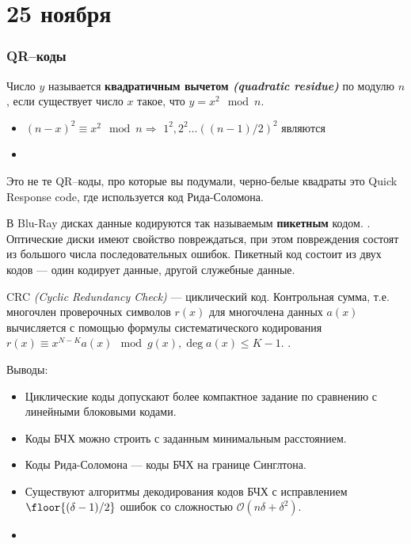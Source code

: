 \chapter{25 ноября}

\unfinished

\subsection{QR--коды}

\begin{definition}
    Число \(y\) называется \textbf{квадратичным вычетом
    \textit{(quadratic residue)}} по модулю \(n\), если существует число \(x\)
    такое, что \(y = x^2 \mod n\).
\end{definition}

\begin{prop}\itemfix
    \begin{itemize}
        \item \((n - x)^2 \equiv x^2 \mod n \Rightarrow\)
        \(1^2, 2^2 \dots ((n - 1) / 2)^2\) являются  \unfinished
        \item \unfinished
    \end{itemize}
\end{prop}

Это не те QR--коды, про которые вы подумали, черно-белые квадраты
это Quick Response code, где используется код Рида-Соломона.

В Blu-Ray дисках данные кодируются так называемым \textbf{пикетным}
кодом. \unfinished.
Оптические диски имеют свойство повреждаться, при этом повреждения
состоят из большого числа последовательных ошибок.
Пикетный код состоит из двух кодов --- один кодирует данные, другой
служебные данные. \unfinished

CRC \textit{(Cyclic Redundancy Check)} --- циклический код. 
Контрольная сумма, т.е. многочлен проверочных символов \(r(x)\)
для многочлена данных \(a(x)\) вычисляется с помощью формулы
систематического кодирования \(r(x) \equiv x^{N - K} a(x) \mod g(x),
\deg a(x) \leq K - 1\).
\unfinished.

Выводы:
\begin{itemize}
    \item Циклические коды допускают более компактное задание по сравнению
    с линейными блоковыми кодами.
    \item Коды БЧХ можно строить с заданным минимальным расстоянием.
    \item Коды Рида-Соломона --- коды БЧХ на границе Синглтона.
    \item Существуют алгоритмы декодирования кодов БЧХ с исправлением
    \(\floor{(\delta - 1) / 2}\) ошибок со сложностью
    \(\mathcal{O}(n\delta + \delta^2)\).
    \item \unfinished
\end{itemize}

